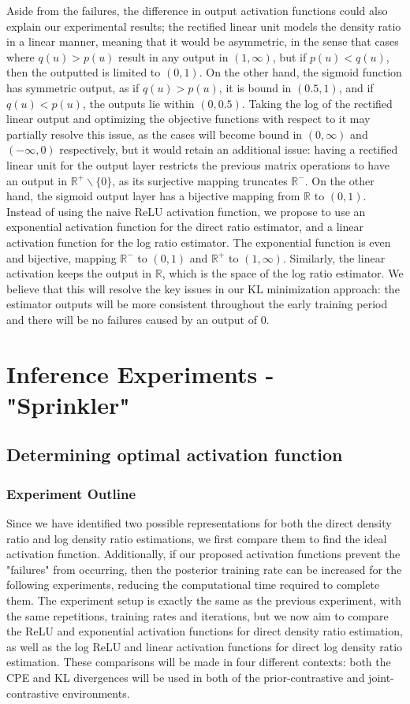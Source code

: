 \documentclass[honours,12pt]{unswthesis}
\newcommand{\R}{\mathbb{R}}
\numberwithin{equation}{section}
\theoremstyle{definition}
\begin{document}
Aside from the failures, the difference in output activation functions could also explain our experimental results; the rectified linear unit models the density ratio in a linear manner, meaning that it would be asymmetric, in the sense that cases where $q(u)>p(u)$ result in any output in $(1,\infty)$, but if $p(u)<q(u)$, then the outputted is limited to $(0,1)$. On the other hand, the sigmoid function has symmetric output, as if $q(u)>p(u)$, it is bound in $(0.5,1)$, and if $q(u)<p(u)$, the outputs lie within $(0,0.5)$. Taking the log of the rectified linear output and optimizing the objective functions with respect to it may partially resolve this issue, as the cases will become bound in $(0,\infty)$ and $(-\infty,0)$ respectively, but it would retain an additional issue: having a rectified linear unit for the output layer restricts the previous matrix operations to have an output in $\R^{+}\backslash \{0\}$, as its surjective mapping truncates $\R^-$. On the other hand, the sigmoid output layer has a bijective mapping from $\R$ to $(0,1)$.\\
Instead of using the naive ReLU activation function, we propose to use an exponential activation function for the direct ratio estimator, and a linear activation function for the log ratio estimator. The exponential function is even and bijective, mapping $\R^-$ to $(0,1)$ and $\R^+$ to $(1,\infty)$. Similarly, the linear activation keeps the output in $\R$, which is the space of the log ratio estimator. We believe that this will resolve the key issues in our KL minimization approach: the estimator outputs will be more consistent throughout the early training period and there will be no failures caused by an output of $0$.
\chapter{Inference Experiments - "Sprinkler"}
\section{Determining optimal activation function}
\subsection{Experiment Outline}
Since we have identified two possible representations for both the direct density ratio and log density ratio estimations, we first compare them to find the ideal activation function. Additionally, if our proposed activation functions prevent the "failures" from occurring, then the posterior training rate can be increased for the following experiments, reducing the computational time required to complete them. The experiment setup is exactly the same as the previous experiment, with the same repetitions, training rates and iterations, but we now aim to compare the ReLU and exponential activation functions for direct density ratio estimation, as well as the log ReLU and linear activation functions for direct log density ratio estimation. These comparisons will be made in four different contexts: both the CPE and KL divergences will be used in both of the prior-contrastive and joint-contrastive environments.
\end{document}

